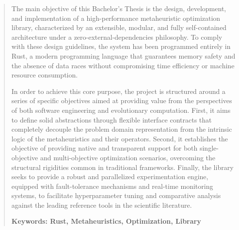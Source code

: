 \documentclass[12pt,a4paper,twoside,openright]{book}
\begin{document}
\renewcommand{\abstractname}{Abstract}
\begin{abstract}
   
The main objective of this Bachelor's Thesis is the design, development, and implementation of a high-performance metaheuristic optimization library, characterized by an extensible, modular, and fully self-contained architecture under a zero-external-dependencies philosophy. To comply with these design guidelines, the system has been programmed entirely in Rust, a modern programming language that guarantees memory safety and the absence of data races without compromising time efficiency or machine resource consumption.

In order to achieve this core purpose, the project is structured around a series of specific objectives aimed at providing value from the perspectives of both software engineering and evolutionary computation. First, it aims to define solid abstractions through flexible interface contracts that completely decouple the problem domain representation from the intrinsic logic of the metaheuristics and their operators. Second, it establishes the objective of providing native and transparent support for both single-objective and multi-objective optimization scenarios, overcoming the structural rigidities common in traditional frameworks. Finally, the library seeks to provide a robust and parallelized experimentation engine, equipped with fault-tolerance mechanisms and real-time monitoring systems, to facilitate hyperparameter tuning and comparative analysis against the leading reference tools in the scientific literature.


\medskip
\noindent\textbf{Keywords: Rust, Metaheuristics, Optimization, Library } 
\end{abstract}
\end{document}
